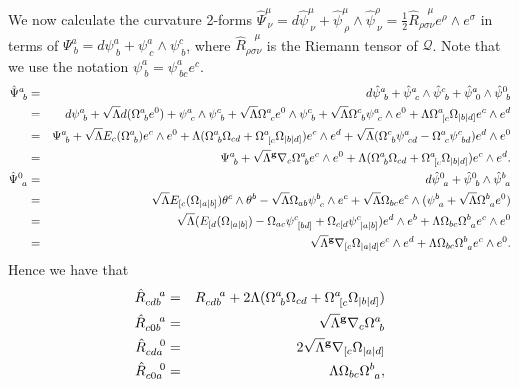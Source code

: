 We now calculate the curvature 2-forms $\hat{\Psi}_{\ \nu}^{\mu}={d}\hat{\psi}_{\ \nu}^{\mu}+\hat{\psi}_{\ \rho}^{\mu}\wedge\hat{\psi}_{\ \nu}^{\rho}=\frac{1}{2}\hat{R}_{\rho\sigma\nu}^{\ \ \ \ \mu}e^{\rho}\wedge e^{\sigma}$
in terms of $\Psi_{\ b}^{a}={d}\psi_{\ b}^{a}+\psi_{\ c}^{a}\wedge\psi_{\ b}^{c}$,
where $\hat{R}_{\rho\sigma\nu}^{\ \ \ \ \mu}$ is the Riemann
tensor of $\mathcal{Q}$. Note that we use the notation $\psi_{\ b}^{a}=\psi_{\ bc}^{a}e^{c}$. 
\begin{eqnarray*}
\hat{\Psi}_{\ b}^{a} & = & {d}\hat{\psi}_{\ b}^{a}+\hat{\psi}_{\ c}^{a}\wedge\hat{\psi}_{\ b}^{c}+\hat{\psi}_{\ 0}^{a}\wedge\hat{\psi}_{\ b}^{0}\\
 & = & {d}\psi_{\ b}^{a}+{\sqrt{\Lambda}{d}}(\Omega_{\ b}^{a}e^{0})+\psi_{\ c}^{a}\wedge\psi_{\ b}^{c}+\sqrt{\Lambda}\Omega_{\ c}^{a}e^{0}\wedge\psi_{\ b}^{c}+\sqrt{\Lambda}\Omega_{\ b}^{c}\psi_{\ c}^{a}\wedge e^{0}+\Lambda\Omega_{\ [c}^{a}\Omega_{|b|d]}e^{c}\wedge e^{d}\\
 & = & \Psi_{\ b}^{a}+\sqrt{\Lambda}E_{c}(\Omega_{\ b}^{a})e^{c}\wedge e^{0}+\Lambda(\Omega_{\ b}^{a}\Omega_{cd}+\Omega_{\ [c}^{a}\Omega_{|b|d]})e^{c}\wedge e^{d}+\sqrt{\Lambda}(\Omega_{\ b}^{c}\psi_{\ cd}^{a}-\Omega_{\ c}^{a}\psi_{\ bd}^{c})e^{d}\wedge e^{0}\\
 & = & \Psi_{\ b}^{a}+\sqrt{\Lambda}{^{\bf g}\nabla}_{c}\Omega_{\ b}^{a}e^{c}\wedge e^{0}+\Lambda(\Omega_{\ b}^{a}\Omega_{cd}+\Omega_{\ [c}^{a}\Omega_{|b|d]})e^{c}\wedge e^{d}.\\
\hat{\Psi}_{\ a}^{0} & = & {d}\hat{\psi}_{\ a}^{0}+\hat{\psi}_{\ b}^{0}\wedge\hat{\psi}_{\ a}^{b}\\
 & = & \sqrt{\Lambda}E_{[c}(\Omega_{|a|b]})\theta^{c}\wedge\theta^{b}-\sqrt{\Lambda}\Omega_{ab}\psi_{\ c}^{b}\wedge e^{c}+\sqrt{\Lambda}\Omega_{bc}e^{c}\wedge(\psi_{\ a}^{b}+\sqrt{\Lambda}\Omega_{\ a}^{b}e^{0})\\
 & = & \sqrt{\Lambda}(E_{[d}(\Omega_{|a|b]})-\Omega_{ac}\psi_{\ [bd]}^{c}+\Omega_{c[d}\psi_{\ |a|b]}^{c})e^{d}\wedge e^{b}+\Lambda\Omega_{bc}\Omega_{\ a}^{b}e^{c}\wedge e^{0}\\
 & = & \sqrt{\Lambda}{^{\bf g}\nabla}_{[c}\Omega_{|a|d]}e^{c}\wedge e^{d}+\Lambda\Omega_{bc}\Omega_{\ a}^{b}e^{c}\wedge e^{0}.
\end{eqnarray*}
Hence we have that
\begin{eqnarray*}
\hat{R}_{cdb}^{\ \ \ a} & = & R_{cdb}^{\ \ \ a}+2\Lambda(\Omega_{\ b}^{a}\Omega_{cd}+\Omega_{\ [c}^{a}\Omega_{|b|d]})\\
\hat{R}_{c0b}^{\ \ \ a} & = & \sqrt{\Lambda}{^{\bf g}\nabla}_{c}\Omega_{\ b}^{a}\\
\hat{R}_{cda}^{\ \ \ 0} & = & 2\sqrt{\Lambda}{^{\bf g}\nabla}_{[c}\Omega_{|a|d]}\\
\hat{R}_{c0a}^{\ \ \ 0} & = & \Lambda\Omega_{bc}\Omega_{\ a}^{b},
\end{eqnarray*}
